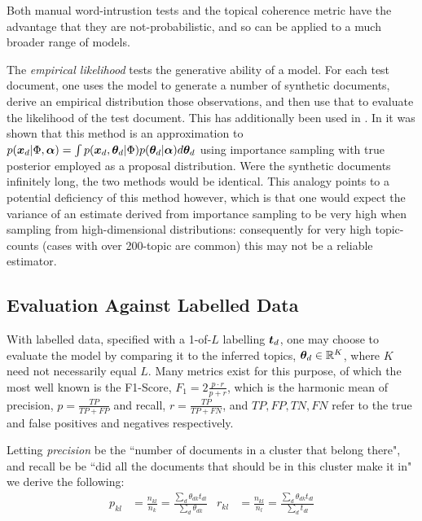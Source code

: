 Both manual word-intrustion tests and the topical coherence metric have the advantage that they are not-probabilistic, and so can be applied to a much broader range of models.


The \emph{empirical likelihood} \cite{Li2006}\cite{Doyle2009}\cite{Mimno2008} tests the generative ability of a model. For each test document, one uses the model to generate a number of synthetic documents, derive an empirical distribution those observations, and then use that to evaluate the likelihood of the test document. This has additionally been used in . In \cite{Wallach2009} it was shown that this method is an approximation to $p(\bm x_d|\Phi, \bm \alpha) = \int p(\bm x_d, { \bm \theta_d } | \Phi)p({ \bm \theta_d }|\bm \alpha)d{ \bm \theta_d }$ using importance sampling with true posterior employed as a proposal distribution. Were the synthetic documents infinitely long, the two methods would be identical. This analogy points to a potential deficiency of this method however, which is that one would expect the variance of an estimate derived from importance sampling to be very high when sampling from high-dimensional distributions: consequently for very high topic-counts (cases with over 200-topic are common) this may not be a reliable estimator.

\subsection*{Evaluation Against Labelled Data}
With labelled data, specified with a 1-of-$L$ labelling $\bm t_d$, one may choose to evaluate the model by comparing it to the inferred topics, ${ \bm \theta_d } \in { \mathbb{R}^{K} }$, where $K$ need not necessarily equal $L$. Many metrics exist for this purpose, of which the most well known is the F1-Score, $F_1 = 2 \frac{p \cdot r}{p + r}$, which is the harmonic mean of precision, $p=\frac{TP}{TP+FP}$ and recall, $r=\frac{TP}{TP+FN}$, and $TP, FP, TN, FN$ refer to the true and false positives and negatives respectively.


Letting \emph{precision} be the ``number of documents in a cluster that belong there", and recall be be ``did all the documents that should be in this cluster make it in" we derive the following:
\begin{align}
p_{kl} & = \frac{n_{kl}}{n_k} = \frac{\sum_d \theta_{dk} t_{dl}}{\sum_d \theta_{dk}}  & r_{kl} & = \frac{n_{kl}}{n_l} = \frac{\sum_d \theta_{dk} t_{dl}}{\sum_d t_{dl}} \label{eqn:myrecall}
\end{align}

